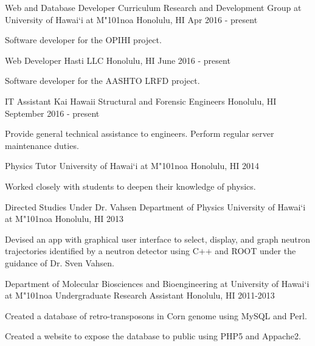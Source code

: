 \begin{cventries}
	\cventry
	{Web and Database Developer}
	{Curriculum Research and Development Group at University of Hawai`i at M{\char"101}noa}
	{Honolulu, HI}
	{Apr 2016 - present}
	{
		\begin{cvitems}
			\item {Software developer for the OPIHI project.}
		\end{cvitems}
	}
    \cventry
    {Web Developer}
    {Hasti LLC}
    {Honolulu, HI}
    {June 2016 - present}
    {
        \begin{cvitems}
            \item {Software developer for the AASHTO LRFD project.}
        \end{cvitems}
    }
    \cventry
    {IT Assistant}
    {Kai Hawaii Structural and Forensic Engineers}
    {Honolulu, HI}
    {September 2016 - present}
    {
	    \begin{cvitems}
		    \item{Provide general technical assistance to engineers. Perform regular server maintenance duties.}	
	    \end{cvitems}	
    }
	
	\cventry
	{Physics Tutor}
	{University of Hawai`i at M{\char"101}noa}
	{Honolulu, HI}
	{2014}
	{
		\begin{cvitems}
			\item {Worked closely with students to deepen their knowledge of physics.}
		\end{cvitems}
	}
	\cventry
	{Directed Studies Under Dr. Vahsen}
	{Department of Physics University of Hawai`i at M{\char"101}noa}
	{Honolulu, HI}
	{2013}
	{
		\begin{cvitems}
			\item {Devised an app with graphical user interface to select, display, and graph neutron trajectories identified by a neutron detector using C++ and
				ROOT under the guidance of Dr. Sven Vahsen.}
		\end{cvitems}
	}
	\cventry
	{Department of Molecular Biosciences and Bioengineering at University of Hawai`i at M{\char"101}noa}
	{Undergraduate Research Assistant}
	{Honolulu, HI}
	{2011-2013}
	{
		\begin{cvitems}
			\item {Created a database of retro-transposons in Corn genome using MySQL and Perl.}
			\item {Created a website to expose the database to public using PHP5 and Appache2.}
		\end{cvitems}
	}
\end{cventries}

